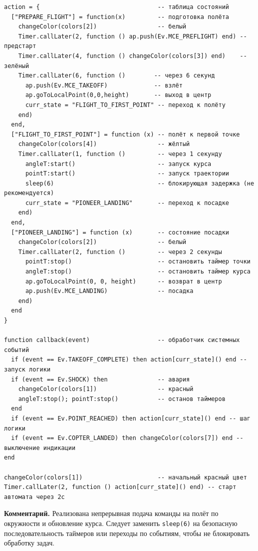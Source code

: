 \begin{verbatim}
action = {                                 -- таблица состояний
  ["PREPARE_FLIGHT"] = function(x)         -- подготовка полёта
    changeColor(colors[2])                 -- белый
    Timer.callLater(2, function () ap.push(Ev.MCE_PREFLIGHT) end) -- предстарт
    Timer.callLater(4, function () changeColor(colors[3]) end)    -- зелёный
    Timer.callLater(6, function ()        -- через 6 секунд
      ap.push(Ev.MCE_TAKEOFF)             -- взлёт
      ap.goToLocalPoint(0,0,height)       -- выход в центр
      curr_state = "FLIGHT_TO_FIRST_POINT" -- переход к полёту
    end)
  end,
  ["FLIGHT_TO_FIRST_POINT"] = function (x) -- полёт к первой точке
    changeColor(colors[4])                 -- жёлтый
    Timer.callLater(1, function ()         -- через 1 секунду
      angleT:start()                       -- запуск курса
      pointT:start()                       -- запуск траектории
      sleep(6)                             -- блокирующая задержка (не рекомендуется)
      curr_state = "PIONEER_LANDING"       -- переход к посадке
    end)
  end,
  ["PIONEER_LANDING"] = function (x)       -- состояние посадки
    changeColor(colors[2])                 -- белый
    Timer.callLater(2, function ()         -- через 2 секунды
      pointT:stop()                        -- остановить таймер точки
      angleT:stop()                        -- остановить таймер курса
      ap.goToLocalPoint(0, 0, height)      -- возврат в центр
      ap.push(Ev.MCE_LANDING)              -- посадка
    end)
  end
}

function callback(event)                   -- обработчик системных событий
  if (event == Ev.TAKEOFF_COMPLETE) then action[curr_state]() end -- запуск логики
  if (event == Ev.SHOCK) then              -- авария
    changeColor(colors[1])                 -- красный
    angleT:stop(); pointT:stop()           -- останов таймеров
  end
  if (event == Ev.POINT_REACHED) then action[curr_state]() end -- шаг логики
  if (event == Ev.COPTER_LANDED) then changeColor(colors[7]) end -- выключение индикации
end

changeColor(colors[1])                     -- начальный красный цвет
Timer.callLater(2, function () action[curr_state]() end) -- старт автомата через 2с

\end{verbatim}
\textbf{Комментарий.} Реализована непрерывная подача команды на полёт по окружности и обновление курса. Следует заменить \texttt{sleep(6)} на безопасную последовательность таймеров или переходы по событиям, чтобы не блокировать обработку задач.
